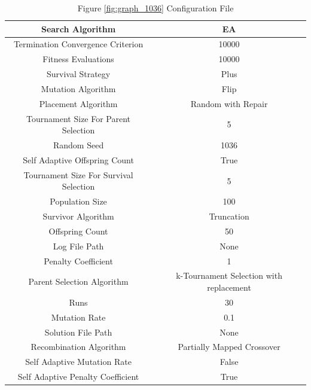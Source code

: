 \documentclass{standalone}
\begin{document}
\begin{table}[!htb]
	\centering
	\caption{Figure \ref{fig:graph_1036} Configuration File}
	\label{tab:graph_1036}
	\begin{tabular}{| c | c |}
		\hline
		Search Algorithm		& EA		 \\
		\hline
		Termination Convergence Criterion		& 10000		 \\
		\hline
		Fitness Evaluations		& 10000		 \\
		\hline
		Survival Strategy		& Plus		 \\
		\hline
		Mutation Algorithm		& Flip		 \\
		\hline
		Placement Algorithm		& Random with Repair		 \\
		\hline
		Tournament Size For Parent Selection		& 5		 \\
		\hline
		Random Seed		& 1036		 \\
		\hline
		Self Adaptive Offspring Count		& True		 \\
		\hline
		Tournament Size For Survival Selection		& 5		 \\
		\hline
		Population Size		& 100		 \\
		\hline
		Survivor Algorithm		& Truncation		 \\
		\hline
		Offspring Count		& 50		 \\
		\hline
		Log File Path		& None		 \\
		\hline
		Penalty Coefficient		& 1		 \\
		\hline
		Parent Selection Algorithm		& k-Tournament Selection with replacement		 \\
		\hline
		Runs		& 30		 \\
		\hline
		Mutation Rate		& 0.1		 \\
		\hline
		Solution File Path		& None		 \\
		\hline
		Recombination Algorithm		& Partially Mapped Crossover		 \\
		\hline
		Self Adaptive Mutation Rate		& False		 \\
		\hline
		Self Adaptive Penalty Coefficient		& True		 \\
		\hline
	\end{tabular}
\end{table}
\end{document}
